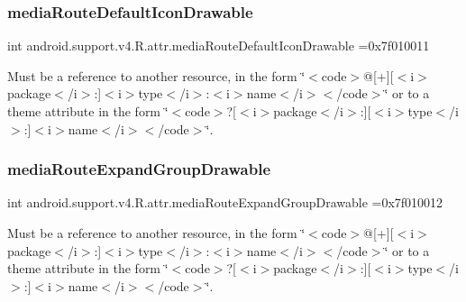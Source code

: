 \subsubsection{\texorpdfstring{media\+Route\+Default\+Icon\+Drawable}{mediaRouteDefaultIconDrawable}}
{\footnotesize\ttfamily int android.\+support.\+v4.\+R.\+attr.\+media\+Route\+Default\+Icon\+Drawable =0x7f010011\hspace{0.3cm}{\ttfamily [static]}}

Must be a reference to another resource, in the form \char`\"{}$<$code$>$@\mbox{[}+\mbox{]}\mbox{[}$<$i$>$package$<$/i$>$\+:\mbox{]}$<$i$>$type$<$/i$>$\+:$<$i$>$name$<$/i$>$$<$/code$>$\char`\"{} or to a theme attribute in the form \char`\"{}$<$code$>$?\mbox{[}$<$i$>$package$<$/i$>$\+:\mbox{]}\mbox{[}$<$i$>$type$<$/i$>$\+:\mbox{]}$<$i$>$name$<$/i$>$$<$/code$>$\char`\"{}. \mbox{\label{classandroid_1_1support_1_1v4_1_1R_1_1attr_a1393c7eb214b18dd5f72868ef6079c12}} 
\subsubsection{\texorpdfstring{media\+Route\+Expand\+Group\+Drawable}{mediaRouteExpandGroupDrawable}}
{\footnotesize\ttfamily int android.\+support.\+v4.\+R.\+attr.\+media\+Route\+Expand\+Group\+Drawable =0x7f010012\hspace{0.3cm}{\ttfamily [static]}}

Must be a reference to another resource, in the form \char`\"{}$<$code$>$@\mbox{[}+\mbox{]}\mbox{[}$<$i$>$package$<$/i$>$\+:\mbox{]}$<$i$>$type$<$/i$>$\+:$<$i$>$name$<$/i$>$$<$/code$>$\char`\"{} or to a theme attribute in the form \char`\"{}$<$code$>$?\mbox{[}$<$i$>$package$<$/i$>$\+:\mbox{]}\mbox{[}$<$i$>$type$<$/i$>$\+:\mbox{]}$<$i$>$name$<$/i$>$$<$/code$>$\char`\"{}. \mbox{\label{classandroid_1_1support_1_1v4_1_1R_1_1attr_a2b4856f07bae527f95b5e6e044e7af36}} 

